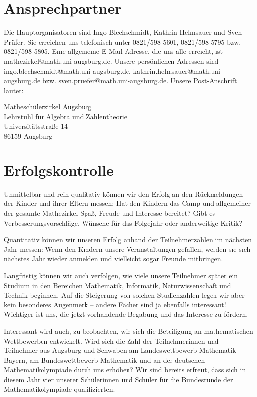\documentclass[12pt]{zettel}
\begin{document}
\section{Ansprechpartner}

Die Hauptorganisatoren sind Ingo Blechschmidt, Kathrin Helmsauer und Sven
Prüfer. Sie erreichen uns telefonisch unter 0821/598-5601, 0821/598-5795 bzw.
0821/598-5805. Eine allgemeine E-Mail-Adresse, die uns alle erreicht, ist
\textsf{mathezirkel@math.uni-augsburg.de}. Unsere persönlichen Adressen sind
\textsf{ingo.blechschmidt@math.uni-augsburg.de},
\textsf{kathrin.helmsauer@math.uni-augsburg.de} bzw.
\textsf{sven.pruefer@math.uni-augsburg.de}. Unsere Post-Anschrift lautet:

\begin{tabbing}
  Matheschülerzirkel Augsburg \\
  Lehrstuhl für Algebra und Zahlentheorie \\
  Universitätsstraße 14 \\
  86159 Augsburg
\end{tabbing}


\section{Erfolgskontrolle}

Unmittelbar und rein qualitativ können wir den Erfolg an den Rückmeldungen der
Kinder und ihrer Eltern messen: Hat den Kindern das Camp und allgemeiner der
gesamte Mathezirkel Spaß, Freude und Interesse bereitet? Gibt es
Verbesserungsvorschläge, Wünsche für das Folgejahr oder anderweitige Kritik?

Quantitativ können wir unseren Erfolg anhand der Teilnehmerzahlen im nächsten
Jahr messen: Wenn den Kindern unsere Veranstaltungen gefallen, werden sie sich
nächstes Jahr wieder anmelden und vielleicht sogar Freunde mitbringen.

Langfristig können wir auch verfolgen, wie viele unsere Teilnehmer später ein
Studium in den Bereichen Mathematik, Informatik, Naturwissenschaft und Technik
beginnen. Auf die Steigerung von solchen Studienzahlen legen wir aber kein
besonderes Augenmerk -- andere Fächer sind ja ebenfalls interessant! Wichtiger
ist uns, die jetzt vorhandende Begabung und das Interesse zu fördern.

Interessant wird auch, zu beobachten, wie sich die Beteiligung an
mathematischen Wettbewerben entwickelt. Wird sich die Zahl der
Teilnehmerinnen und Teilnehmer aus Augsburg und Schwaben am Landeswettbewerb
Mathematik Bayern, am Bundeswettbewerb Mathematik und an der deutschen
Mathematikolympiade durch uns erhöhen? Wir sind bereits erfreut,
dass sich in diesem Jahr vier unserer Schülerinnen und Schüler für die
Bundesrunde der Mathematikolympiade qualifizierten.
\end{document}
